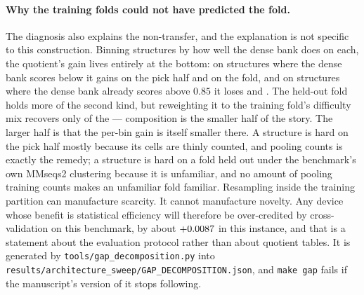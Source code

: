 \documentclass[11pt]{article}
\begin{document}
\paragraph{Why the training folds could not have predicted the fold.} The
diagnosis also explains the non-transfer, and the explanation is not specific to
this construction. Binning structures by how well the dense bank does on each,
the quotient's gain lives entirely at the bottom: on structures where the dense
bank scores below \GapHardCut{} it gains \GapHardTrainGain{} on the pick half
and \GapHardTestGain{} on the fold, and on structures where the dense bank
already scores above \(0.85\) it loses \GapEasyTrainGain{} and
\GapEasyTestGain{}. The held-out fold holds more of the second kind, but
reweighting it to the training fold's difficulty mix recovers only
\GapReweighted{} of the \QuoTrainGain{} --- composition is the smaller half of
the story. The larger half is that the per-bin gain is itself smaller there. A
structure is hard on the pick half mostly because its cells are thinly counted,
and pooling counts is exactly the remedy; a structure is hard on a fold held out
under the benchmark's own MMseqs2 clustering because it is unfamiliar, and no
amount of pooling training counts makes an unfamiliar fold familiar. Resampling
inside the training partition can manufacture scarcity. It cannot manufacture
novelty. Any device whose benefit is statistical efficiency will therefore be
over-credited by cross-validation on this benchmark, by about
\(+0.0087{}\) in this instance, and that is a statement about the
evaluation protocol rather than about quotient tables. It is generated by
\texttt{tools/gap\_decomposition.py} into
\texttt{results/architecture\_sweep/GAP\_DECOMPOSITION.json}, and \texttt{make
gap} fails if the manuscript's version of it stops following.
\end{document}
